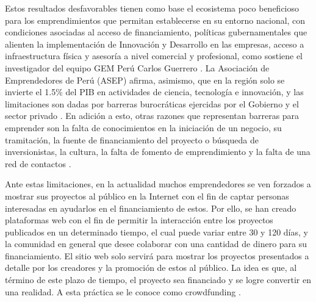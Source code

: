 Estos resultados desfavorables tienen como base el ecosistema poco beneficioso para los emprendimientos que permitan establecerse en su entorno nacional, con condiciones asociadas al acceso de financiamiento, políticas gubernamentales que alienten la implementación de Innovación y Desarrollo en las empresas, acceso a infraestructura física y asesoría a nivel comercial y profesional, como sostiene el investigador del equipo GEM Perú Carlos Guerrero \parencite{cr_gestion2018emprend}. La Asociación de Emprendedores de Perú (ASEP) afirma, asimismo, que en la región solo se invierte el 1.5\% del PIB en actividades de ciencia, tecnología e innovación, y las limitaciones son dadas por barreras burocráticas ejercidas por el Gobierno y el sector privado \parencite{cr_aep2018emprend}. En adición a esto, otras razones que representan barreras para emprender son la falta de conocimientos en la iniciación de un negocio, su tramitación, la fuente de financiamiento del proyecto o búsqueda de inversionistas, la cultura, la falta de fomento de emprendimiento y la falta de una red de contactos \parencite{cr_sandoval_barreras}.

Ante estas limitaciones, en la actualidad muchos emprendedores se ven forzados a mostrar sus proyectos al público en la Internet con el fin de captar personas interesadas en ayudarlos en el financiamiento de estos. Por ello, se han creado plataformas web con el fin de permitir la interacción entre los proyectos publicados en un determinado tiempo, el cual puede variar entre 30 y 120 días, y la comunidad en general que desee colaborar con una cantidad de dinero para su financiamiento. El sitio web solo servirá para mostrar los proyectos presentados a detalle por los creadores y la promoción de estos al público. La idea es que, al término de este plazo de tiempo, el proyecto sea financiado y se logre convertir en una realidad. A esta práctica se le conoce como crowdfunding \parencite{cr_uc_crowdfunding}.

